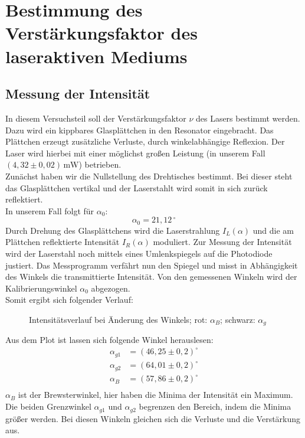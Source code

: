 \section{Bestimmung des Verstärkungsfaktor des laseraktiven Mediums}
\subsection{Messung der Intensität}
In diesem Versuchsteil soll der Verstärkungsfaktor $\nu$ des Lasers bestimmt werden.
Dazu wird ein kippbares Glasplättchen in den Resonator eingebracht.
Das Plättchen erzeugt zusätzliche Verluste, durch winkelabhängige Reflexion.
Der Laser wird hierbei mit einer möglichst großen Leistung (in unserem Fall $\left(4,32\pm0,02\right)\,\text{mW}$) betrieben.\\

Zunächst haben wir die Nullstellung des Drehtisches bestimmt.
Bei dieser steht das Glasplättchen vertikal und der Laserstahlt wird somit in sich zurück reflektiert.\\
In unserem Fall folgt für $\alpha_0$:
\begin{equation}
    \alpha_0=21,12\,^\circ
\end{equation}
Durch Drehung des Glasplättchens wird die Laserstrahlung $I_L(\alpha)$ und die am Plättchen reflektierte Intensität $I_R(\alpha)$ moduliert.
Zur Messung der Intensität wird der Laserstahl noch mittels eines Umlenkspiegels auf die Photodiode justiert.
Das Messprogramm verfährt nun den Spiegel und misst in Abhängigkeit des Winkels die transmittierte Intensität.
Von den gemessenen Winkeln wird der Kalibrierungswinkel $\alpha_0$ abgezogen.\\
Somit ergibt sich folgender Verlauf:
\begin{figure}[h]
  \centering\scalebox{1.1}{}
  \caption{Intensitätsverlauf bei Änderung des Winkels; rot: $\alpha_B$; schwarz: $\alpha_g$}
\end{figure}\newpage
Aus dem Plot ist lassen sich folgende Winkel herauslesen:
\begin{align}
    \alpha_{g1}&=\left(46,25\pm0,2\right)^\circ\\
    \alpha_{g2}&=\left(64,01\pm0,2\right)^\circ\\
    \alpha_{B}&=\left(57,86\pm0,2\right)^\circ\\
\end{align}
$\alpha_{B}$ ist der Brewsterwinkel, hier haben die Minima der Intensität ein Maximum.
Die beiden Grenzwinkel $\alpha_{g1}$ und $\alpha_{g2}$ begrenzen den Bereich, indem die Minima größer werden.
Bei diesen Winkeln gleichen sich die Verluste und die Verstärkung aus.\\

